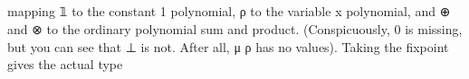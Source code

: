 \begin{code}%
%
\>[2]\AgdaSpace{}%
\AgdaSymbol{:}\AgdaSpace{}%
\AgdaSpace{}%
\AgdaSpace{}%
\AgdaSpace{}%
\AgdaSpace{}%
\<%
\\
%
\>[2]\AgdaSpace{}%
%
\>[11]\AgdaSpace{}%
\AgdaSpace{}%
\AgdaSymbol{=}\AgdaSpace{}%
\<%
\\
%
\>[2]\AgdaSpace{}%
%
\>[11]\AgdaSpace{}%
\AgdaSpace{}%
\AgdaSymbol{=}\AgdaSpace{}%
\<%
\\
%
\>[2]\AgdaSpace{}%
\AgdaSpace{}%
\AgdaSpace{}%
%
\>[11]\AgdaSpace{}%
\AgdaSpace{}%
\AgdaSymbol{=}\AgdaSpace{}%
\AgdaSymbol{(}\AgdaSpace{}%
\AgdaSpace{}%
\AgdaSpace{}%
\AgdaSymbol{)}\AgdaSpace{}%
\AgdaSpace{}%
\AgdaSymbol{(}\AgdaSpace{}%
\AgdaSpace{}%
\AgdaSpace{}%
\AgdaSymbol{)}\<%
\\
%
\>[2]\AgdaSpace{}%
\AgdaSpace{}%
\AgdaSpace{}%
%
\>[11]\AgdaSpace{}%
\AgdaSpace{}%
\AgdaSymbol{=}\AgdaSpace{}%
\AgdaSymbol{(}\AgdaSpace{}%
\AgdaSpace{}%
\AgdaSpace{}%
\AgdaSymbol{)}\AgdaSpace{}%
\AgdaSpace{}%
\AgdaSymbol{(}\AgdaSpace{}%
\AgdaSpace{}%
\AgdaSpace{}%
\AgdaSymbol{)}\<%
\end{code}
mapping 𝟙 to the constant 1 polynomial, ρ to the variable x polynomial, and ⊕ and ⊗ to the ordinary polynomial sum and product. (Conspicuously, 0 is missing, but you can see that ⊥ is not. After all, μ ρ has no values). Taking the fixpoint gives the actual type
\begin{code}%
%
\>[2]\AgdaSpace{}%
\AgdaSpace{}%
\AgdaSymbol{(}\AgdaSpace{}%
\AgdaSymbol{:}\AgdaSpace{}%
\AgdaSymbol{)}\AgdaSpace{}%
\AgdaSymbol{:}\AgdaSpace{}%
\AgdaSpace{}%
\<%
\\
\>[2][@{}l@{\AgdaIndent{0}}]%
\>[4]\AgdaSpace{}%
\AgdaSymbol{:}\AgdaSpace{}%
\AgdaSpace{}%
\AgdaSpace{}%
\AgdaSpace{}%
\AgdaSymbol{(}\AgdaSpace{}%
\AgdaSymbol{)}\AgdaSpace{}%
\AgdaSpace{}%
\AgdaSpace{}%
\<%
\end{code}
